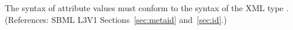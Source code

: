 The syntax of  attribute values must conform to the syntax of the
XML type .  (References: SBML L3V1 
Sections~\ref{sec:metaid} and~\ref{sec:id}.)
